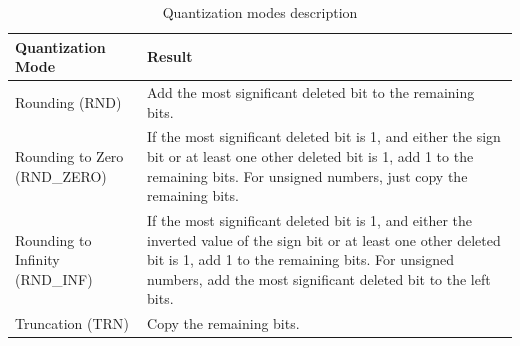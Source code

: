 \begin{table}[h]
    \centering
    \begin{tabular}{|>{\centering\arraybackslash}p{2cm}|
                     >{\centering\arraybackslash}p{6cm}|}
        \arrayrulecolor{sandnavy!50}\hline
        \rowcolor{sandnavy!50}\hline
        \textcolor{sandwhite}{\textbf{Quantization Mode}} &
        \textcolor{sandwhite}{\textbf{Result}} \\ \hline
        Rounding (\small{RND}) & Add the most significant deleted bit to the remaining bits. \\ \hline
        Rounding to Zero (\small{RND\_ZERO}) & If the most significant deleted bit is 1, and either the sign bit or at least one other deleted bit is 1, add 1 to the remaining bits. For unsigned numbers, just copy the remaining bits. \\ \hline
        Rounding to Infinity (\small{RND\_INF}) & If the most significant deleted bit is 1, and either the inverted value of the sign bit or at least one other deleted bit is 1, add 1 to the remaining bits. For unsigned numbers, add the most significant deleted bit to the left bits. \\ \hline
        Truncation (\small{TRN}) & Copy the remaining bits. \\ \hline
    \end{tabular}
    \caption{Quantization modes description}
    \label{tab:quantization}
\end{table}
